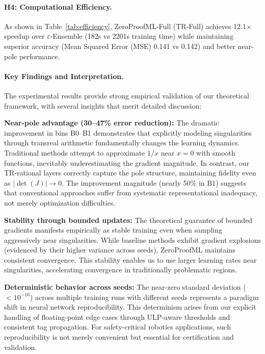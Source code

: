 \documentclass[twoside,11pt]{article}
\begin{document}
\paragraph{H4: Computational Efficiency.}
As shown in Table~\ref{tab:efficiency}, ZeroProofML-Full (TR-Full) achieves 12.1$\times$ speedup over $\varepsilon$-Ensemble (182s vs 2201s training time) while maintaining superior accuracy (Mean Squared Error (MSE) 0.141 vs 0.142) and better near-pole performance.


\paragraph{Key Findings and Interpretation.}
The experimental results provide strong empirical validation of our theoretical framework, with several insights that merit detailed discussion:

\textbf{Near-pole advantage (30--47\% error reduction):} The dramatic improvement in bins B0--B1 demonstrates that explicitly modeling singularities through transreal arithmetic fundamentally changes the learning dynamics. Traditional methods attempt to approximate $1/x$ near $x=0$ with smooth functions, inevitably underestimating the gradient magnitude. In contrast, our TR-rational layers correctly capture the pole structure, maintaining fidelity even as $|\det(J)| \to 0$. The improvement magnitude (nearly 50\% in B1) suggests that conventional approaches suffer from systematic representational inadequacy, not merely optimization difficulties.

\textbf{Stability through bounded updates:} The theoretical guarantee of bounded gradients manifests empirically as stable training even when sampling aggressively near singularities. While baseline methods exhibit gradient explosions (evidenced by their higher variance across seeds), ZeroProofML maintains consistent convergence. This stability enables us to use larger learning rates near singularities, accelerating convergence in traditionally problematic regions.

\textbf{Deterministic behavior across seeds:} The near-zero standard deviation ($<10^{-16}$) across multiple training runs with different seeds represents a paradigm shift in neural network reproducibility. This determinism arises from our explicit handling of floating-point edge cases through ULP-aware thresholds and consistent tag propagation. For safety-critical robotics applications, such reproducibility is not merely convenient but essential for certification and validation.
\end{document}
